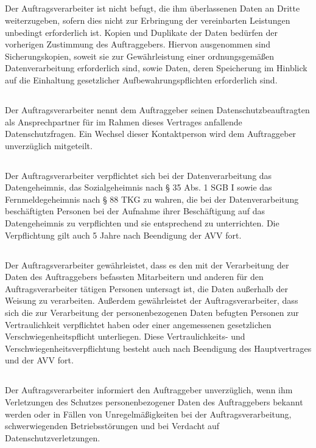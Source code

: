 \documentclass[10pt]{article}
\begin{document}
\subsection{} Der Auftragsverarbeiter ist nicht befugt, die ihm überlassenen Daten an Dritte
weiterzugeben, sofern dies nicht zur Erbringung der vereinbarten Leistungen
unbedingt erforderlich ist. Kopien und Duplikate der Daten bedürfen der vorherigen
Zustimmung des Auftraggebers. Hiervon ausgenommen sind Sicherungskopien,
soweit sie zur Gewährleistung einer ordnungsgemäßen Datenverarbeitung
erforderlich sind, sowie Daten, deren Speicherung im Hinblick auf die Einhaltung
gesetzlicher Aufbewahrungspflichten erforderlich sind.
\subsection{} Der Auftragsverarbeiter nennt dem Auftraggeber seinen Datenschutzbeauftragten
als Ansprechpartner für im Rahmen dieses Vertrages anfallende Datenschutzfragen.
Ein Wechsel dieser Kontaktperson wird dem Auftraggeber unverzüglich mitgeteilt.
\subsection{} Der Auftragsverarbeiter verpflichtet sich bei der Datenverarbeitung das
Datengeheimnis, das Sozialgeheimnis nach § 35 Abs. 1 SGB I sowie das
Fernmeldegeheimnis nach § 88 TKG zu wahren, die bei der Datenverarbeitung
beschäftigten Personen bei der Aufnahme ihrer Beschäftigung auf das
Datengeheimnis zu verpflichten und sie entsprechend zu unterrichten. Die
Verpflichtung gilt auch 5 Jahre nach Beendigung der AVV fort.\subsection{} Der Auftragsverarbeiter gewährleistet, dass es den mit der Verarbeitung der Daten
des Auftraggebers befassten Mitarbeitern und anderen für den Auftragsverarbeiter
tätigen Personen untersagt ist, die Daten außerhalb der Weisung zu verarbeiten.
Außerdem gewährleistet der Auftragsverarbeiter, dass sich die zur Verarbeitung der
personenbezogenen Daten befugten Personen zur Vertraulichkeit verpflichtet haben
oder einer angemessenen gesetzlichen Verschwiegenheitspflicht unterliegen. Diese
Vertraulichkeits- und Verschwiegenheitsverpflichtung besteht auch nach Beendigung
des Hauptvertrages und der AVV fort.
\subsection{} Der Auftragsverarbeiter informiert den Auftraggeber unverzüglich, wenn ihm
Verletzungen des Schutzes personenbezogener Daten des Auftraggebers bekannt
werden oder in Fällen von Unregelmäßigkeiten bei der Auftragsverarbeitung,
schwerwiegenden Betriebsstörungen und bei Verdacht auf Datenschutzverletzungen.
\end{document}
